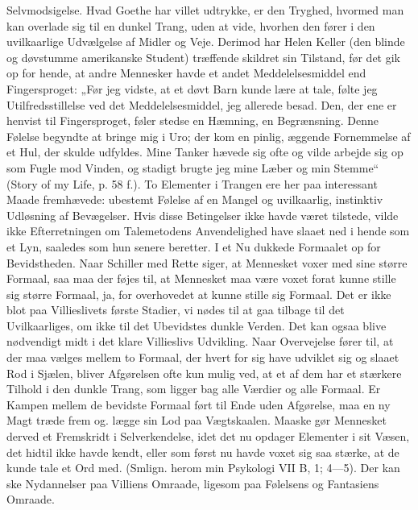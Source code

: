\documentclass[12pt,a4paper,openany]{book}
\newcommand{\opage}[1]{\marginnote{\footnotesize\textit{[#1]}}}
\begin{document}
Selvmodsigelse. Hvad Goethe har villet udtrykke, er den
Tryghed, hvormed man kan overlade sig til en dunkel Trang,
uden at vide, hvorhen den fører i den uvilkaarlige Udvælgelse
af Midler og Veje. Derimod har Helen Keller (den blinde og
døvstumme amerikanske Student) træffende skildret sin Tilstand,
før det gik op for hende, at andre Mennesker havde et andet
Meddelelsesmiddel end Fingersproget: „Før jeg vidste, at et
døvt Barn kunde lære at tale, følte jeg Utilfredsstillelse ved
det Meddelelsesmiddel, jeg allerede besad. Den, der ene er
henvist til Fingersproget, føler stedse en Hæmning, en Begrænsning.
Denne Følelse begyndte at bringe mig i Uro; der
kom en pinlig, æggende Fornemmelse af et Hul, der skulde
udfyldes. Mine Tanker hævede sig ofte og vilde arbejde sig
op som Fugle mod Vinden, og stadigt brugte jeg mine Læber
og min Stemme“ (Story of my Life, p. 58 f.). To Elementer
i Trangen ere her paa interessant Maade fremhævede: ubestemt
Følelse af en Mangel og uvilkaarlig, instinktiv Udløsning af Bevægelser.
Hvis disse Betingelser ikke havde været tilstede,
vilde ikke Efterretningen om Talemetodens Anvendelighed have
slaaet ned i hende som et Lyn, saaledes som hun senere beretter.
I et Nu dukkede Formaalet op for Bevidstheden. Naar
Schiller med Rette siger, at Mennesket voxer med sine større
Formaal, saa maa der føjes til, at Mennesket maa være voxet
\setcounter{footnote}{0}%
\opage{39}forat kunne stille sig større Formaal, ja, for overhovedet at
kunne stille sig Formaal. Det er ikke blot paa Villieslivets
første Stadier, vi nødes til at gaa tilbage til det Uvilkaarliges,
om ikke til det Ubevidstes dunkle Verden. Det kan ogsaa
blive nødvendigt midt i det klare Villieslivs Udvikling. Naar
Overvejelse fører til, at der maa vælges mellem to Formaal,
der hvert for sig have udviklet sig og slaaet Rod i Sjælen,
bliver Afgørelsen ofte kun mulig ved, at et af dem har et
stærkere Tilhold i den dunkle Trang, som ligger bag alle Værdier
og alle Formaal. Er Kampen mellem de bevidste Formaal
ført til Ende uden Afgørelse, maa en ny Magt træde frem og.
lægge sin Lod paa Vægtskaalen. Maaske gør Mennesket derved
et Fremskridt i Selverkendelse, idet det nu opdager Elementer
i sit Væsen, det hidtil ikke havde kendt, eller som først
nu havde voxet sig saa stærke, at de kunde tale et Ord med.
(Smlign. herom min Psykologi VII B, 1; 4---5). Der kan ske
Nydannelser paa Villiens Omraade, ligesom paa Følelsens og
Fantasiens Omraade.
\end{document}
